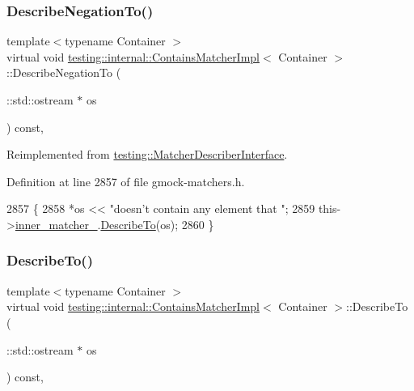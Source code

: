 \subsubsection{\texorpdfstring{Describe\+Negation\+To()}{DescribeNegationTo()}}
{\footnotesize\ttfamily template$<$typename Container $>$ \\
virtual void \hyperlink{classtesting_1_1internal_1_1ContainsMatcherImpl}{testing\+::internal\+::\+Contains\+Matcher\+Impl}$<$ Container $>$\+::Describe\+Negation\+To (\begin{DoxyParamCaption}\item[{\+::std\+::ostream $\ast$}]{os }\end{DoxyParamCaption}) const\hspace{0.3cm}{\ttfamily [inline]}, {\ttfamily [virtual]}}



Reimplemented from \hyperlink{classtesting_1_1MatcherDescriberInterface_a2071afbc47097c4d1c0064275af34db0}{testing\+::\+Matcher\+Describer\+Interface}.



Definition at line 2857 of file gmock-\/matchers.\+h.


\begin{DoxyCode}
2857                                                         \{
2858     *os << \textcolor{stringliteral}{"doesn't contain any element that "};
2859     this->\hyperlink{classtesting_1_1internal_1_1QuantifierMatcherImpl_af0ee2a4697f5cb8e937fd29dd75e2a30}{inner\_matcher\_}.\hyperlink{classtesting_1_1internal_1_1MatcherBase_a7e0c883c7745e0d646463077ef1c1267}{DescribeTo}(os);
2860   \}
\end{DoxyCode}
\mbox{\label{classtesting_1_1internal_1_1ContainsMatcherImpl_af47e4e9f890d64e7f8abcdf3f5fb8b3e}} 
\subsubsection{\texorpdfstring{Describe\+To()}{DescribeTo()}}
{\footnotesize\ttfamily template$<$typename Container $>$ \\
virtual void \hyperlink{classtesting_1_1internal_1_1ContainsMatcherImpl}{testing\+::internal\+::\+Contains\+Matcher\+Impl}$<$ Container $>$\+::Describe\+To (\begin{DoxyParamCaption}\item[{\+::std\+::ostream $\ast$}]{os }\end{DoxyParamCaption}) const\hspace{0.3cm}{\ttfamily [inline]}, {\ttfamily [virtual]}}



